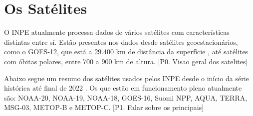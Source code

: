 \documentclass[cic,tc]{iiufrgs}
\begin{document}
\section{Os Satélites}

O INPE atualmente processa dados de vários satélites com características
distintas entre sí. Estão presentes nos dados desde satélites geoestacionários, 
como o GOES-12, que está a 29.400 km de distância da superfície 
\citep{GOES12Algo}, até satélites com óbitas polares, entre 700 a 900 km de altura.
[P0. Visao geral dos satelites] \par

Abaixo segue um resumo dos satélites usados pelos INPE desde o início da 
série histórica até final de 2022 \cite{EmbrapaSatelites}. 
Os que estão em funcionamento pleno atualmente são:
NOAA-20, NOAA-19, NOAA-18, GOES-16, Suomi NPP, AQUA, TERRA, MSG-03, 
METOP-B e METOP-C. [P1. Falar sobre os principais]\par
\end{document}
